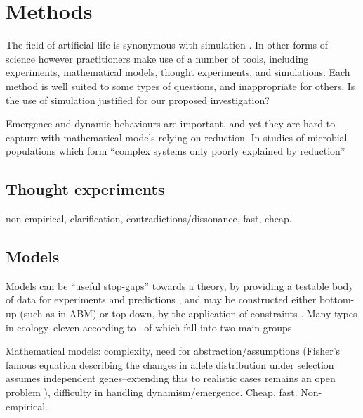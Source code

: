 \section{Methods}

The field of artificial life is synonymous with simulation \autocite[chap.2]{Aicardi2010}. In other forms of science however practitioners make use of a number of tools, including experiments, mathematical models, thought experiments, and simulations. Each method is well suited to some types of questions, and inappropriate for others. Is the use of simulation justified for our proposed investigation?

Emergence and dynamic behaviours are important, and yet they are hard to capture with mathematical models relying on reduction. In studies of microbial populations which form ``complex systems only poorly explained by reduction'' \autocite{Ferrer:2008hv}

\subsection{Thought experiments}\label{thought-experiments}

non-empirical, clarification, contradictions/dissonance, fast, cheap.

\subsection{Models}\label{models}


Models can be ``useful stop-gaps'' towards a theory, by providing a testable body of data for experiments and predictions \autocite{Krakauer2011}, and may be constructed either bottom-up (such as in ABM) or top-down, by the application of constraints \autocite{Krakauer2011}. Many types in \eg ecology--eleven according to \autocite{Jorgensen2008}--of which fall into two main groups

Mathematical models: complexity, need for abstraction/assumptions
(\eg Fisher's famous equation describing the changes in allele
distribution under selection assumes independent genes--extending this
to realistic cases remains an open problem \autocite{Schuster2011}),
difficulty in handling dynamism/emergence. Cheap, fast. Non-empirical.

